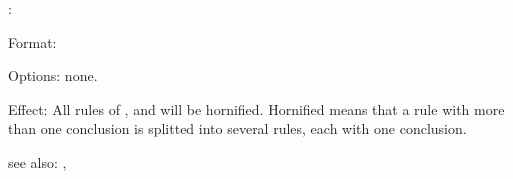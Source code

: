 :

Format: 

Options: none.

Effect:	All rules of ,  and
	 will be hornified.
	Hornified means that a rule with more than one conclusion is 
	splitted into several rules, each with one conclusion.
	
	
see also: , 

